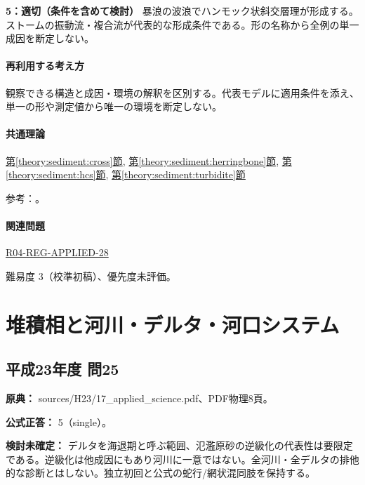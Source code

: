 \noindent\textbf{5：適切（条件を含めて検討）} 暴浪の波浪でハンモック状斜交層理が形成する。ストームの振動流・複合流が代表的な形成条件である。形の名称から全例の単一成因を断定しない。\par

\paragraph{再利用する考え方} 観察できる構造と成因・環境の解釈を区別する。代表モデルに適用条件を添え、単一の形や測定値から唯一の環境を断定しない。

\paragraph{共通理論} \hyperref[theory:sediment:cross]{第\ref*{theory:sediment:cross}節}, \hyperref[theory:sediment:herringbone]{第\ref*{theory:sediment:herringbone}節}, \hyperref[theory:sediment:hcs]{第\ref*{theory:sediment:hcs}節}, \hyperref[theory:sediment:turbidite]{第\ref*{theory:sediment:turbidite}節}

\par 参考：\cite{sed_mit_environment,sed_mit_cross,sed_houston_structures}。

\paragraph{関連問題} \hyperref[q:r04-reg-applied-28]{R04-REG-APPLIED-28}

\par 難易度 3（校準初稿）、優先度未評価。

\section{堆積相と河川・デルタ・河口システム}

\subsection{平成23年度 問25}
\label{q:h23-reg-applied-25}

\noindent\textbf{原典：} sources/H23/17\_applied\_science.pdf、PDF物理8頁。

\textbf{公式正答：} 5（single）。

\par\textbf{検討未確定：} デルタを海退期と呼ぶ範囲、氾濫原砂の逆級化の代表性は要限定である。逆級化は他成因にもあり河川に一意ではない。全河川・全デルタの排他的な診断とはしない。独立初回と公式の蛇行/網状混同肢を保持する。

